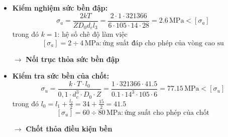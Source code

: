 \begin{itemize}
    \item \textbf{Kiểm nghiệm sức bền đập:}
    \begin{equation}
        \sigma_a = \frac{2kT}{ZD_0 d_c l_3} = \frac{2 \cdot 1 \cdot 321366}{6 \cdot 105 \cdot 14 \cdot 28} = 2.6 \, \text{MPa} < [\sigma_a]
    \end{equation}
    trong đó \( k = 1 \): hệ số chê độ làm việc
    \[
    [\sigma_a] = 2 \div 4 \, \text{MPa} : \text{ứng suất đáp cho phép của vòng cao su}
    \]

    \item[\(\rightarrow\)] \textbf{Nối trục thỏa sức bền đập}

    \item \textbf{Kiểm tra sức bền của chốt:}
    \begin{equation}
    \sigma_u = \frac{k \cdot T \cdot l_0}{0,1 \cdot d^3_c \cdot D_0 \cdot Z} = \frac{1 \cdot 321366 \cdot 41.5}{0.1 \cdot 14^3 \cdot 105 \cdot 6} = 77.15 \, \text{MPa} < [\sigma_u]
    \end{equation}
    trong đó \( l_0 = l_1 + \frac{l_2}{2} = 34 + \frac{15}{2} = 41.5 \)
    \[
    [\sigma_u] = 60 \div 80 \, \text{MPa} : \text{ứng suất cho phép của chốt}
    \]
    \item[\(\rightarrow\)] \textbf{Chốt thỏa điều kiện bền}
\end{itemize}
